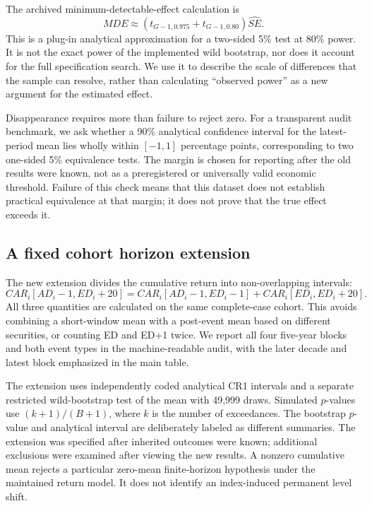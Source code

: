 The archived minimum-detectable-effect calculation is
\begin{equation}
 MDE\approx\left(t_{G-1,0.975}+t_{G-1,0.80}\right)\widehat{SE}.
 \label{eq:mde}
\end{equation}
This is a plug-in analytical approximation for a two-sided 5\% test at 80\% power. It is not the exact power of the implemented wild bootstrap, nor does it account for the full specification search. We use it to describe the scale of differences that the sample can resolve, rather than calculating ``observed power'' as a new argument for the estimated effect.

Disappearance requires more than failure to reject zero. For a transparent audit benchmark, we ask whether a 90\% analytical confidence interval for the latest-period mean lies wholly within $[-1,1]$ percentage points, corresponding to two one-sided 5\% equivalence tests. The margin is chosen for reporting after the old results were known, not as a preregistered or universally valid economic threshold. Failure of this check means that this dataset does not establish practical equivalence at that margin; it does not prove that the true effect exceeds it.

\subsection{A fixed cohort horizon extension}

The new extension divides the cumulative return into non-overlapping intervals:
\begin{equation}
 CAR_i[AD_i-1,ED_i+20]
 =CAR_i[AD_i-1,ED_i-1]+CAR_i[ED_i,ED_i+20].
 \label{eq:horizon}
\end{equation}
All three quantities are calculated on the same complete-case cohort. This avoids combining a short-window mean with a post-event mean based on different securities, or counting ED and ED+1 twice. We report all four five-year blocks and both event types in the machine-readable audit, with the later decade and latest block emphasized in the main table.

The extension uses independently coded analytical CR1 intervals and a separate restricted wild-bootstrap test of the mean with 49,999 draws. Simulated $p$-values use $(k+1)/(B+1)$, where $k$ is the number of exceedances. The bootstrap $p$-value and analytical interval are deliberately labeled as different summaries. The extension was specified after inherited outcomes were known; additional exclusions were examined after viewing the new results. A nonzero cumulative mean rejects a particular zero-mean finite-horizon hypothesis under the maintained return model. It does not identify an index-induced permanent level shift.
